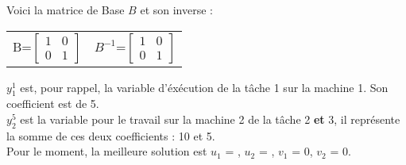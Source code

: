 \vspace{0.5cm}
Voici la matrice de Base $B$ et son inverse : 
\\

\begin{center}
\begin{tabular}{c c}
B=$\begin{bmatrix}
1 & 0 \\
0 & 1
 \end{bmatrix} $                  
&
$B^{-1}$=$\begin{bmatrix}
1 & 0 \\
0 & 1
 \end{bmatrix} $             
\end{tabular}
\end{center}


$y_1^1$ est, pour rappel, la variable d'éxécution de la tâche 1 sur la machine 1. Son coefficient est de 5. \\
$y_2^5$ est la variable pour le travail sur la machine 2 de la tâche 2 \textbf{et} 3, il représente la somme de ces deux coefficients : 10 et 5. \\

Pour le moment, la meilleure solution est \textit{$u_1$} = ,  \textit{$u_2$} = , \textit{$v_1$} = 0, \textit{$v_2$} = 0.    \\

